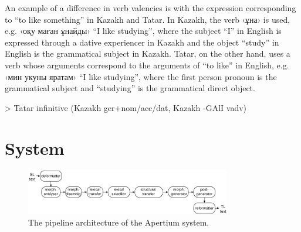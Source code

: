 \documentclass[11pt]{article}
\begin{document}



An example of a difference in verb valencies is with the expression corresponding to ``to like something'' in Kazakh and Tatar.  In Kazakh, the verb ‹ұна› is used, e.g. ‹оқу маған ұнайды› ``I like studying'', where the subject ``I'' in English is expressed through a dative experiencer in Kazakh and the object ``study'' in English is the grammatical subject in Kazakh.  Tatar, on the other hand, uses a verb whose arguments correspond to the arguments of ``to like'' in English, e.g. ‹мин укуны яратам› ``I like studying'', where the first person pronoun is the grammatical subject and ``studying'' is the grammatical direct object.

> Tatar infinitive (Kazakh ger+nom/acc/dat, Kazakh -GAlI vadv)

\section{System}
\label{sec:sys}

\begin{figure}[htbp]
\begin{center}
 \includegraphics[width=0.8\textwidth]{architecture.pdf}
\end{center}
\caption{The pipeline architecture of the Apertium system.}
\label{fig:modules}
\end{figure}
\end{document}
